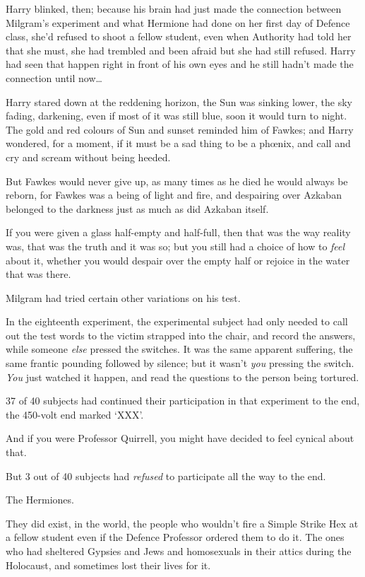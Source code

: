 Harry blinked, then; because his brain had just made the connection between Milgram’s experiment and what Hermione had done on her first day of Defence class, she’d refused to shoot a fellow student, even when Authority had told her that she must, she had trembled and been afraid but she had still refused. Harry had seen that happen right in front of his own eyes and he still hadn’t made the connection until now…

Harry stared down at the reddening horizon, the Sun was sinking lower, the sky fading, darkening, even if most of it was still blue, soon it would turn to night. The gold and red colours of Sun and sunset reminded him of Fawkes; and Harry wondered, for a moment, if it must be a sad thing to be a phœnix, and call and cry and scream without being heeded.

But Fawkes would never give up, as many times as he died he would always be reborn, for Fawkes was a being of light and fire, and despairing over Azkaban belonged to the darkness just as much as did Azkaban itself.

If you were given a glass half-empty and half-full, then that was the way reality was, that was the truth and it was so; but you still had a choice of how to \emph{feel} about it, whether you would despair over the empty half or rejoice in the water that was there.

Milgram had tried certain other variations on his test.

In the eighteenth experiment, the experimental subject had only needed to call out the test words to the victim strapped into the chair, and record the answers, while someone \emph{else} pressed the switches. It was the same apparent suffering, the same frantic pounding followed by silence; but it wasn’t \emph{you} pressing the switch. \emph{You} just watched it happen, and read the questions to the person being tortured.

37 of 40 subjects had continued their participation in that experiment to the end, the 450-volt end marked ‘XXX’.

And if you were Professor Quirrell, you might have decided to feel cynical about that.

But 3 out of 40 subjects had \emph{refused} to participate all the way to the end.

The Hermiones.

They did exist, in the world, the people who wouldn’t fire a Simple Strike Hex at a fellow student even if the Defence Professor ordered them to do it. The ones who had sheltered Gypsies and Jews and homosexuals in their attics during the Holocaust, and sometimes lost their lives for it.

